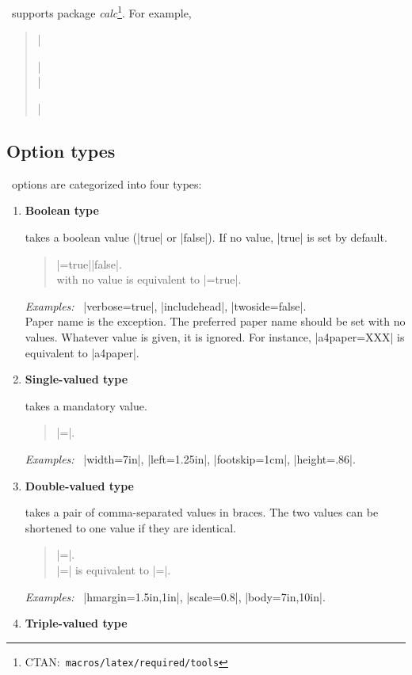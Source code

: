 \Gm\ supports package 
\textsl{calc}\footnote{CTAN:~\texttt{macros/latex/required/tools}}.
For example,
\begin{quote}
  |\usepackage{calc}|\\
  |\usepackage[textheight=20\baselineskip+10pt]{geometry}|
\end{quote}

\subsection{Option types}
\Gm\ options are categorized into four types:

\begin{enumerate}\itemsep=0pt
\item \textbf{Boolean type}

   takes a boolean value (|true| or |false|). If no value,
   |true| is set by default.
   \begin{quote}
      |=true|\OR|false|.\\
       with no value is equivalent to 
      |=true|.
   \end{quote}
   \textit{Examples:}~ |verbose=true|, |includehead|, 
   |twoside=false|.\\
   Paper name is the exception. The preferred paper name should be set
   with no values. Whatever value is given, it is ignored. For
   instance, |a4paper=XXX| is equivalent to |a4paper|.

\item \textbf{Single-valued type}

   takes a mandatory value.
   \begin{quote}
   |=|.
   \end{quote}
   \textit{Examples:}~ |width=7in|, |left=1.25in|,
   |footskip=1cm|, |height=.86\paperheight|.

\item \textbf{Double-valued type}

   takes a pair of comma-separated values in braces. The two values can
   be shortened to one value if they are identical.
   \begin{quote}
   |=|.\\
   |=| is equivalent to 
             |=|.
   \end{quote}
   \textit{Examples:}~ |hmargin={1.5in,1in}|, |scale=0.8|,
   |body={7in,10in}|.

\item \textbf{Triple-valued type}


\end{enumerate}
